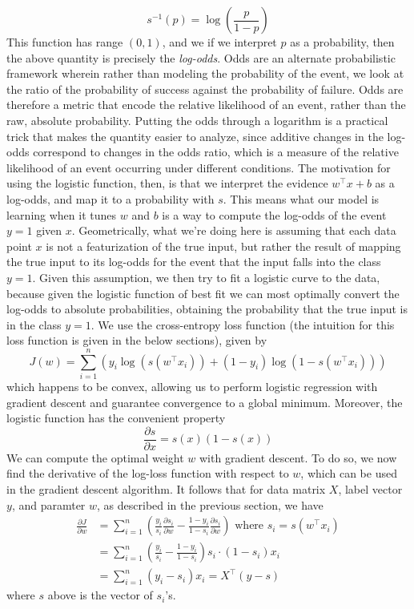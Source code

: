 \documentclass{article}
\begin{document}
$$ s^{-1}(p) = \log \left( \frac{p}{1 - p} \right) $$
This function has range $ (0, 1) $, and we if we interpret $ p $ as a probability, then the above quantity is precisely the \textit{log-odds}. Odds are an alternate probabilistic framework wherein rather than modeling the probability of the event, we look at the ratio of the probability of success against the probability of failure. Odds are therefore a metric that encode the relative likelihood of an event, rather than the raw, absolute probability. Putting the odds through a logarithm is a practical trick that makes the quantity easier to analyze, since additive changes in the log-odds correspond to changes in the odds ratio, which is a measure of the relative likelihood of an event occurring under different conditions. The motivation for using the logistic function, then, is that we interpret the evidence $ w^\intercal x + b $ as a log-odds, and map it to a probability with $ s $. This means what our model is learning when it tunes $ w $ and $ b $ is a way to compute the log-odds of the event $ y = 1 $ given $ x $.
\newline
Geometrically, what we're doing here is assuming that each data point $ x $ is not a featurization of the true input, but rather the result of mapping the true input to its log-odds for the event that the input falls into the class $ y = 1 $. Given this assumption, we then try to fit a logistic curve to the data, because given the logistic function of best fit we can most optimally convert the log-odds to absolute probabilities, obtaining the probability that the true input is in the class $ y = 1 $.
\newline
We use the cross-entropy loss function (the intuition for this loss function is given in the below sections), given by
$$ J(w) = \sum_{i = 1}^n \left( y_i \log(s(w^\intercal x_i)) + (1 - y_i) \log(1 - s(w^\intercal x_i)) \right) $$
which happens to be convex, allowing us to perform logistic regression with gradient descent and guarantee convergence to a global minimum. Moreover, the logistic function has the convenient property
$$ \frac{\partial s}{\partial x} = s(x) (1 - s(x)) $$
We can compute the optimal weight $ w $ with gradient descent. To do so, we now find the derivative of the log-loss function with respect to $ w $, which can be used in the gradient descent algorithm. It follows that for data matrix $ X $, label vector $ y $, and paramter $ w $, as described in the previous section, we have
$$ \begin{aligned}
    \frac{\partial J}{\partial w} &= \sum_{i = 1}^n \left( \frac{y_i}{s_i} \frac{\partial s_i}{\partial w} - \frac{1 - y_i}{1 - s_i} \frac{\partial s_i}{\partial w} \right) \text{ where } s_i = s(w^\intercal x_i) \\
    &= \sum_{i = 1}^n \left( \frac{y_i}{s_i} - \frac{1 - y_i}{1 - s_i} \right) s_i \cdot (1 - s_i) x_i \\
    &= \sum_{i = 1}^n (y_i - s_i) x_i = X^\intercal (y - s)
\end{aligned} $$
where $ s $ above is the vector of $ s_i $'s.
\end{document}
